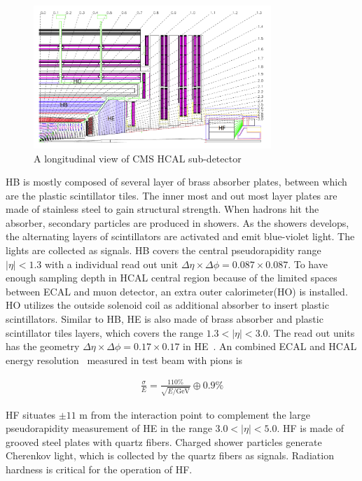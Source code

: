 \begin{figure}[htbp] 
\centering
\includegraphics[width=0.8\textwidth]{chapter3/HCAL_sketch.png}
\caption{A longitudinal view of CMS HCAL sub-detector~\cite{CMS_experiment}}
\label{fig:HCALL_sketch}
\end{figure}


HB is mostly composed of  several layer of brass absorber plates, between which are the plastic scintillator tiles. The inner most and out most layer plates are made of stainless steel to gain structural strength. When hadrons hit the absorber, secondary particles are produced in showers. As the showers develops, the alternating layers of scintillators are activated and emit blue-violet light. The lights are collected as signals. HB covers the central pseudorapidity range $|\eta|<1.3$ with a individual read out unit $\Delta \eta\times\Delta\phi=0.087\times 0.087$. To have enough sampling depth in HCAL central region because of the limited spaces between ECAL and muon detector, an extra outer calorimeter(HO) is installed.  HO utilizes the outside solenoid coil as additional absorber to insert plastic scintillators. Similar to HB, HE is also made of brass absorber and plastic scintillator tiles layers, which covers the range $1.3<|\eta|<3.0$. The read out units has the geometry $\Delta \eta\times\Delta\phi=0.17\times 0.17$ in HE~\cite{CMS_experiment}. An combined ECAL and HCAL energy resolution~\cite{HCAL_reso} measured in test beam with pions is 

\begin{align*}
\frac{\sigma}{E}=\frac{110\%}{\sqrt{E/\textrm{GeV}}}\oplus 0.9\%
\end{align*}

HF situates $\pm11$ m from the interaction point to complement the large pseudorapidity measurement of HE in the range $3.0<|\eta|<5.0$. HF is made of grooved steel plates with quartz fibers. Charged shower particles generate Cherenkov light, which is collected by the quartz fibers as signals. Radiation hardness is critical for the operation of HF.   



